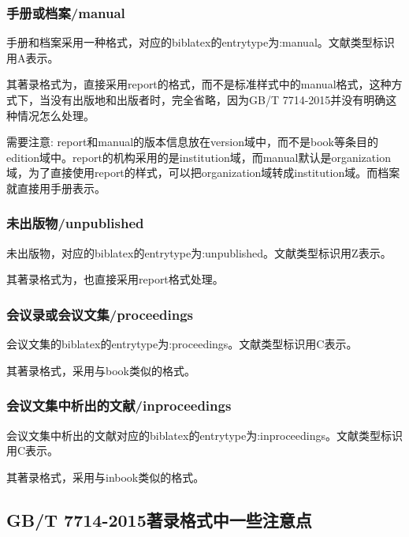 \documentclass[11pt]{article} %
\begin{document}
\subsubsection{手册或档案/manual}
\begin{refentry}{}{}
手册和档案采用一种格式，对应的biblatex的entrytype为:manual。文献类型标识用A表示。

其著录格式为，直接采用report的格式，而不是标准样式中的manual格式，这种方式下，当没有出版地和出版者时，完全省略，因为GB/T 7714-2015并没有明确这种情况怎么处理。
\end{refentry}

需要注意: report和manual的版本信息放在version域中，而不是book等条目的edition域中。report的机构采用的是institution域，而manual默认是organization域，为了直接使用report的样式，可以把organization域转成institution域。而档案就直接用手册表示。

\subsubsection{未出版物/unpublished}
\begin{refentry}{}{}
未出版物，对应的biblatex的entrytype为:unpublished。文献类型标识用Z表示。

其著录格式为，也直接采用report格式处理。
\end{refentry}

\subsubsection{会议录或会议文集/proceedings}
\begin{refentry}{}{}
会议文集的biblatex的entrytype为:proceedings。文献类型标识用C表示。

其著录格式，采用与book类似的格式。
\end{refentry}

\subsubsection{会议文集中析出的文献/inproceedings}
\begin{refentry}{}{}
会议文集中析出的文献对应的biblatex的entrytype为:inproceedings。文献类型标识用C表示。

其著录格式，采用与inbook类似的格式。
\end{refentry}

\subsection{GB/T 7714-2015著录格式中一些注意点}
\end{document}
